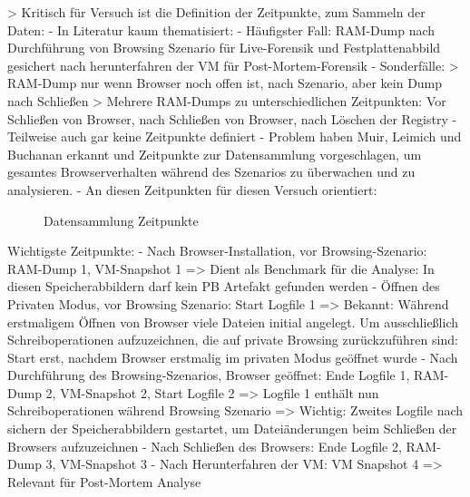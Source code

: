 > Kritisch für Versuch ist die Definition der Zeitpunkte, zum Sammeln der Daten:
	- In Literatur kaum thematisiert:
		- Häufigster Fall: RAM-Dump nach Durchführung von Browsing Szenario für Live-Forensik \cite{Hariharan.2022, Izzati.2022, Md.2018, Ohana.2013} und Festplattenabbild gesichert nach herunterfahren der VM für Post-Mortem-Forensik \cite{Fayyad.2021, Mahlous.2020, Horsman.2019, Md.2018, Gabet.2018, Montasari.2015, Chivers.2014, Ohana.2013}
		- Sonderfälle: 
			> RAM-Dump nur wenn Browser noch offen ist, nach Szenario, aber kein Dump nach Schließen \cite{Mahlous.2020}
			> Mehrere RAM-Dumps zu unterschiedlichen Zeitpunkten: Vor Schließen von Browser, nach Schließen von Browser, nach Löschen der Registry \cite{Rochmadi.2017}
		- Teilweise auch gar keine Zeitpunkte definiert \cite{Sajan.2021, Nalawade.2016, Montasari.2015, Satvat.2014, Said.2011, Aggarwal.2010}
	- Problem haben Muir, Leimich und Buchanan erkannt und Zeitpunkte zur Datensammlung vorgeschlagen, um gesamtes Browserverhalten während des Szenarios zu überwachen und zu analysieren.
	- An diesen Zeitpunkten für diesen Versuch orientiert:
		\begin{figure}[h!]
			\centering
			\small
			\centerline{\resizebox{\linewidth}{!}{}}
			\caption{Datensammlung Zeitpunkte}
			\label{fig:jes}
		\end{figure}
	Wichtigste Zeitpunkte:
		- Nach Browser-Installation, vor Browsing-Szenario: RAM-Dump 1, VM-Snapshot 1 
			=> Dient als Benchmark für die Analyse: In diesen Speicherabbildern darf kein PB Artefakt gefunden werden
		- Öffnen des Privaten Modus, vor Browsing Szenario: Start Logfile 1
			=> Bekannt: Während erstmaligem Öffnen von Browser viele Dateien initial angelegt. Um ausschließlich Schreiboperationen aufzuzeichnen, die auf private Browsing zurückzuführen sind: Start erst, nachdem Browser erstmalig im privaten Modus geöffnet wurde
		- Nach Durchführung des Browsing-Szenarios, Browser geöffnet: Ende Logfile 1, RAM-Dump 2, VM-Snapshot 2, Start Logfile 2
			=> Logfile 1 enthält nun Schreiboperationen während Browsing Szenario
			=> Wichtig: Zweites Logfile nach sichern der Speicherabbildern gestartet, um Dateiänderungen beim Schließen der Browsers aufzuzeichnen
		- Nach Schließen des Browsers: Ende Logfile 2, RAM-Dump 3, VM-Snapshot 3
		- Nach Herunterfahren der VM: VM Snapshot 4
			=> Relevant für Post-Mortem Analyse

